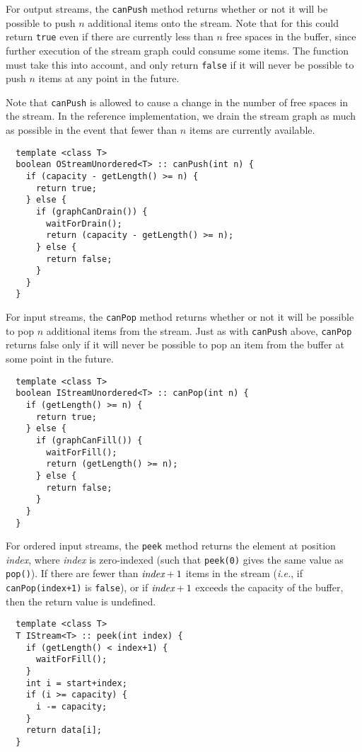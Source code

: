  For output streams, the {\tt canPush} method returns
whether or not it will be possible to push $n$ additional items onto
the stream.  Note that for this could return {\tt true} even if there
are currently less than $n$ free spaces in the buffer, since further
execution of the stream graph could consume some items.  The function
must take this into account, and only return {\tt false} if it will
never be possible to push $n$ items at any point in the future.

Note that {\tt canPush} is allowed to cause a change in the number of
free spaces in the stream.  In the reference implementation, we drain
the stream graph as much as possible in the event that fewer than $n$
items are currently available.

{\small
\begin{verbatim}
  template <class T>
  boolean OStreamUnordered<T> :: canPush(int n) {
    if (capacity - getLength() >= n) {
      return true;
    } else {
      if (graphCanDrain()) {
        waitForDrain();
        return (capacity - getLength() >= n);
      } else {
        return false;
      }
    }
  }
\end{verbatim}}

 For input streams, the {\tt canPop} method returns
whether or not it will be possible to pop $n$ additional items from
the stream.  Just as with {\tt canPush} above, {\tt canPop} returns
false only if it will never be possible to pop an item from the buffer
at some point in the future.

{\small
\begin{verbatim}
  template <class T>
  boolean IStreamUnordered<T> :: canPop(int n) {
    if (getLength() >= n) {
      return true;
    } else {
      if (graphCanFill()) {
        waitForFill();
        return (getLength() >= n);
      } else {
        return false;
      }
    }
  }
\end{verbatim}}

 For ordered input streams, the {\tt peek} method returns
the element at position {\it index}, where {\it index} is zero-indexed
(such that {\tt peek(0)} gives the same value as {\tt pop()}).  If
there are fewer than $\mbox{\it index}+1$ items in the stream ({\it i.e.},
if {\tt canPop(index+1)} is {\tt false}), or if $\mbox{\it index}+1$ exceeds
the capacity of the buffer, then the return value is undefined.

{\small
\begin{verbatim}
  template <class T>
  T IStream<T> :: peek(int index) {
    if (getLength() < index+1) {
      waitForFill();
    }
    int i = start+index;
    if (i >= capacity) {
      i -= capacity;
    }
    return data[i];
  }
\end{verbatim}}

